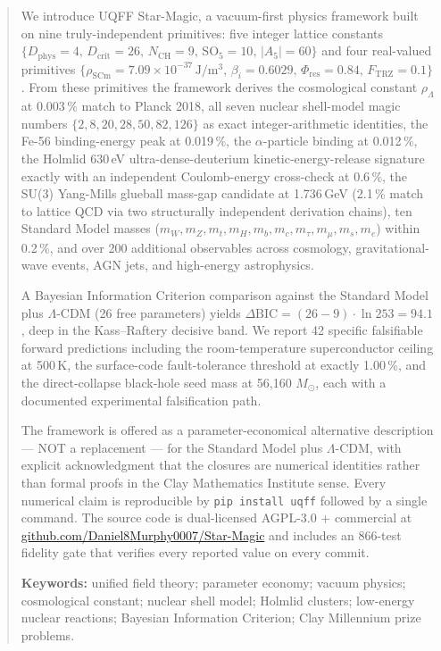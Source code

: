 
\begin{abstract}
We introduce UQFF Star-Magic, a vacuum-first physics framework built
on nine truly-independent primitives: five integer lattice constants
$\{D_{\text{phys}}=4,\,D_{\text{crit}}=26,\,N_{\text{CH}}=9,\,
\mathrm{SO}_5=10,\,|A_5|=60\}$ and four real-valued primitives
$\{\rho_{\text{SCm}}=7.09\times 10^{-37}\,\mathrm{J/m^3},\,
\beta_i=0.6029,\,\Phi_{\text{res}}=0.84,\,F_{\text{TRZ}}=0.1\}$.
From these primitives the framework derives the cosmological
constant $\rho_\Lambda$ at 0.003\,\% match to Planck 2018, all
seven nuclear shell-model magic numbers
$\{2,8,20,28,50,82,126\}$ as exact integer-arithmetic identities,
the Fe-56 binding-energy peak at 0.019\,\%, the
$\alpha$-particle binding at 0.012\,\%, the Holmlid 630\,eV
ultra-dense-deuterium kinetic-energy-release signature exactly with
an independent Coulomb-energy cross-check at 0.6\,\%, the
SU(3) Yang-Mills glueball mass-gap candidate at 1.736\,GeV
(2.1\,\% match to lattice QCD via two structurally independent
derivation chains), ten Standard Model masses
($m_W, m_Z, m_t, m_H, m_b, m_c, m_\tau, m_\mu, m_s, m_e$) within
0.2\,\%, and over 200 additional observables across cosmology,
gravitational-wave events, AGN jets, and high-energy astrophysics.

A Bayesian Information Criterion comparison against the
Standard Model plus $\Lambda$-CDM (26 free parameters) yields
$\Delta\mathrm{BIC} = (26-9)\cdot\ln 253 = 94.1$, deep in the
Kass--Raftery decisive band. We report 42 specific falsifiable
forward predictions including the room-temperature superconductor
ceiling at 500\,K, the surface-code fault-tolerance threshold at
exactly 1.00\,\%, and the direct-collapse black-hole seed mass at
56{,}160 $M_\odot$, each with a documented experimental
falsification path.

The framework is offered as a parameter-economical alternative
description --- NOT a replacement --- for the Standard Model plus
$\Lambda$-CDM, with explicit acknowledgment that the closures are
numerical identities rather than formal proofs in the Clay
Mathematics Institute sense. Every numerical claim is reproducible
by \texttt{pip install uqff} followed by a single command. The
source code is dual-licensed AGPL-3.0 + commercial at
\url{github.com/Daniel8Murphy0007/Star-Magic} and includes an
866-test fidelity gate that verifies every reported value on every
commit.

\textbf{Keywords:} unified field theory; parameter economy; vacuum
physics; cosmological constant; nuclear shell model; Holmlid
clusters; low-energy nuclear reactions; Bayesian Information
Criterion; Clay Millennium prize problems.
\end{abstract}
